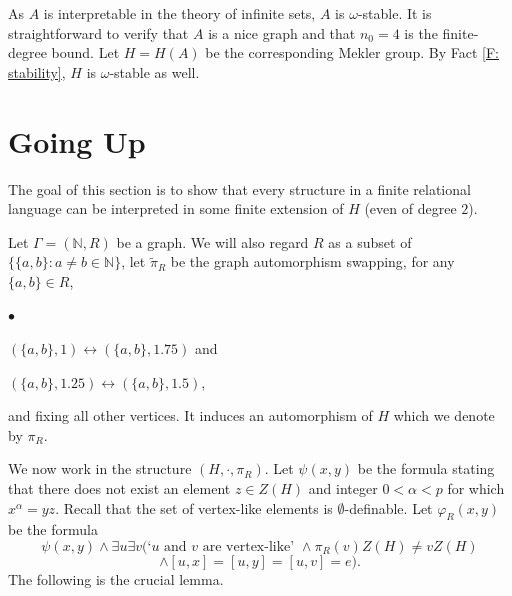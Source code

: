 \documentclass[11pt]{amsart}
\theoremstyle{plain}
\theoremstyle{definition}
\theoremstyle{remark}
\numberwithin{equation}{section}
\begin{document}
As $A$ is interpretable in the theory of infinite sets, $A$ is $\omega$-stable. It is straightforward to verify that $A$ is a nice graph and that $n_0=4$ is the finite-degree bound. Let $H=H(A)$ be the corresponding Mekler group. By Fact \ref{F: stability}, $H$ is $\omega$-stable as well.

\section{Going Up}

The goal of this section is to show  that every structure in a finite relational language can be interpreted in some finite extension of $H$ (even of degree $2$).


Let $\Gamma=(\mathbb{N},R)$ be a graph. We will also regard $R$ as a subset of $\{\{a,b\}: a\neq b\in \mathbb{N}\}$, let $\widetilde \pi_R$ be the graph automorphism swapping, for any $\{a,b\}\in R$,
\begin{list}{$\bullet$}{}
    \item $(\{a,b\},1)\leftrightarrow(\{a,b\},1.75)$ and
    \item $(\{a,b\},1.25)\leftrightarrow(\{a,b\},1.5)$,
\end{list}
and fixing all other vertices. It induces an automorphism of $H$ which we denote by $\pi_R$.



We now work in the structure $(H,\cdot,\pi_R)$. 
Let $\psi(x,y)$ be the formula stating that there does not exist an element $z\in Z(H)$ and integer $0<\alpha<p$ for which $x^\alpha=yz$.
Recall that the set of vertex-like elements is $\emptyset$-definable. Let $\varphi_R(x,y)$ be the formula \[\psi(x,y)\wedge  \exists u\exists v(\text{`$u$ and $v$ are vertex-like' }\wedge\pi_R(v)Z(H)\neq vZ(H)\]\[\wedge [u,x]=[u,y]=[u,v]=e).\]
The following is the crucial lemma.
\end{document}
